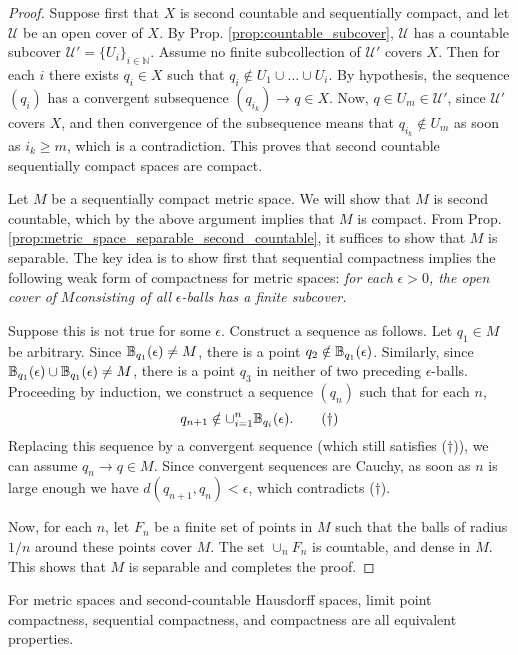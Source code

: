 \documentclass[11pt,a4paper]{article}
\begin{document}
\begin{proof}
Suppose first that $X$ is second countable and sequentially compact, and let $\mathcal{U}$ be an open cover of $X$. By Prop. \ref{prop:countable_subcover}, $\mathcal{U}$ has a countable subcover $\mathcal{U}' = \{U_i\}_{i\in \mathbb{N}}$. Assume no finite subcollection of $\mathcal{U}'$ covers $X$. Then for each $i$ there exists $q_i\in X$ such that $q_i\notin U_1\cup\ldots\cup U_i$. By hypothesis, the sequence $(q_i)$ has a convergent subsequence $(q_{i_k})\rightarrow q\in X$. Now, $q\in U_m\in \mathcal{U}'$, since $\mathcal{U}'$ covers $X$, and then convergence of the subsequence means that $q_{i_k}\notin U_m$ as soon as $i_k\ge m$, which is a contradiction. This proves that second countable sequentially compact spaces are compact. 

Let $M$ be a sequentially compact metric space. We will show that $M$ is second countable, which by the above argument implies that $M$ is compact. From Prop. \ref{prop:metric_space_separable_second_countable}, it suffices to show that $M$ is separable. The key idea is to show first that sequential compactness implies the following weak form of compactness for metric spaces: \textit{for each} $\epsilon>0$\textit{, the open cover of }$M$\textit{consisting of all }$\epsilon$\textit{-balls has a finite subcover.} 

Suppose this is not true for some $\epsilon$. Construct a sequence as follows. Let $q_1\in M$ be arbitrary. Since $\mathbb{B}_{q_1}(\epsilon)\neq M$, there is a point $q_2\notin \mathbb{B}_{q_1}(\epsilon)$. Similarly, since $\mathbb{B}_{q_1}(\epsilon)\cup \mathbb{B}_{q_1}(\epsilon) \neq M$, there is a point $q_3$ in neither of two preceding $\epsilon$-balls. Proceeding by induction, we construct a sequence $(q_n)$ such that for each $n$, $$q_{n+1}\notin \cup_{i=1}^n \mathbb{B}_{q_i}(\epsilon).\qquad{(\dagger)}$$ 
Replacing this sequence by a convergent sequence (which still satisfies ($\dagger$)), we can assume $q_n\rightarrow q\in M$. Since convergent sequences are Cauchy, as soon as $n$ is large enough we have $d(q_{n+1},q_n)<\epsilon$, which contradicts ($\dagger$). 

Now, for each $n$, let $F_n$ be a finite set of points in $M$ such that the balls of radius $1/n$ around these points cover $M$. The set $\cup_n F_n$ is countable, and dense in $M$. This shows that $M$ is separable and completes the proof.
\end{proof}

\begin{corollary}
For metric spaces and second-countable Hausdorff spaces, limit point compactness, sequential compactness, and compactness are all equivalent properties.
\end{corollary}
\end{document}

